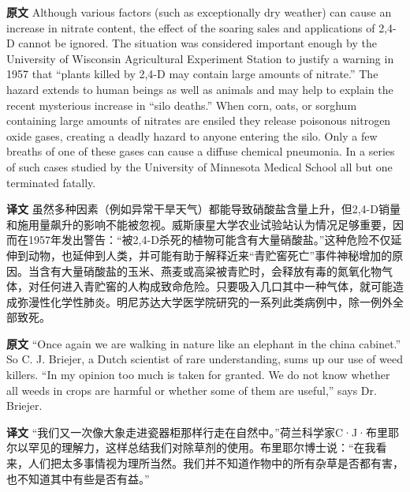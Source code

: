 \documentclass[UTF8,zihao=-4]{ctexart}
\begin{document}
\noindent\textbf{原文} Although various factors (such as exceptionally dry weather) can cause an increase in nitrate content, the effect of the soaring sales and applications of 2,4-D cannot be ignored. The situation was considered important enough by the University of Wisconsin Agricultural Experiment Station to justify a warning in 1957 that ``plants killed by 2,4-D may contain large amounts of nitrate.'' The hazard extends to human beings as well as animals and may help to explain the recent mysterious increase in ``silo deaths.'' When corn, oats, or sorghum containing large amounts of nitrates are ensiled they release poisonous nitrogen oxide gases, creating a deadly hazard to anyone entering the silo. Only a few breaths of one of these gases can cause a diffuse chemical pneumonia. In a series of such cases studied by the University of Minnesota Medical School all but one terminated fatally.
\par
\noindent\textbf{译文} 虽然多种因素（例如异常干旱天气）都能导致硝酸盐含量上升，但2,4-D销量和施用量飙升的影响不能被忽视。威斯康星大学农业试验站认为情况足够重要，因而在1957年发出警告：“被2,4-D杀死的植物可能含有大量硝酸盐。”这种危险不仅延伸到动物，也延伸到人类，并可能有助于解释近来“青贮窖死亡”事件神秘增加的原因。当含有大量硝酸盐的玉米、燕麦或高粱被青贮时，会释放有毒的氮氧化物气体，对任何进入青贮窖的人构成致命危险。只要吸入几口其中一种气体，就可能造成弥漫性化学性肺炎。明尼苏达大学医学院研究的一系列此类病例中，除一例外全部致死。
\par\medskip

\noindent\textbf{原文} ``Once again we are walking in nature like an elephant in the china cabinet.'' So C. J. Briejer, a Dutch scientist of rare understanding, sums up our use of weed killers. ``In my opinion too much is taken for granted. We do not know whether all weeds in crops are harmful or whether some of them are useful,'' says Dr. Briejer.
\par
\noindent\textbf{译文} “我们又一次像大象走进瓷器柜那样行走在自然中。”荷兰科学家C·J·布里耶尔以罕见的理解力，这样总结我们对除草剂的使用。布里耶尔博士说：“在我看来，人们把太多事情视为理所当然。我们并不知道作物中的所有杂草是否都有害，也不知道其中有些是否有益。”
\par\medskip
\end{document}
